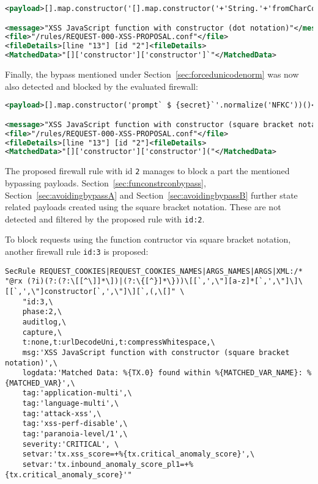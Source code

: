 \begin{lstlisting}[style=ruleStyle, language=XML, caption=fromCharCode() bypass blocked]
<payload>[].map.constructor('[].map.constructor('+'String.'+'fromCharCode(0x61,108,0x65,114,116,0x28,96,120,115,115,0x60,0x29)'+')();')();</payload>

<message>"XSS JavaScript function with constructor (dot notation)"</message>
<file>"/rules/REQUEST-000-XSS-PROPOSAL.conf"</file>
<fileDetails>[line "13"] [id "2"]<fileDetails>
<MatchedData>"[]['constructor']['constructor']`"</MatchedData>
\end{lstlisting}

Finally, the bypass mentioned under Section~\ref{sec:forcedunicodenorm} was now also detected and blocked by the evaluated firewall:

\begin{lstlisting}[style=ruleStyle, language=XML, caption=Forced Unicode Normalization bypass blocked]
<payload>[].map.constructor('prompt` $ {secret}`'.normalize('NFKC'))()</payload>

<message>"XSS JavaScript function with constructor (square bracket notation)"</message>
<file>"/rules/REQUEST-000-XSS-PROPOSAL.conf"</file>
<fileDetails>[line "13"] [id "2"]<fileDetails>
<MatchedData>"[]['constructor']['constructor']("</MatchedData>
\end{lstlisting}

The proposed firewall rule with id \verb|2| manages to block a part the mentioned bypassing payloads. Section~\ref{sec:funconstrconbypass}, Section~\ref{sec:avoidingbypassA} and Section~\ref{sec:avoidingbypassB} further state related payloads created using the square bracket notation. These are not detected and filtered by the proposed rule with \verb|id:2|.

To block requests using the function contructor via square bracket notation, another firewall rule \verb|id:3| is proposed:

\begin{lstlisting}[style=basicStyle, caption=Rule proposal to block usage of Function() constructor in square bracket notation, label={lst:constructorsruleproposalB}]
SecRule REQUEST_COOKIES|REQUEST_COOKIES_NAMES|ARGS_NAMES|ARGS|XML:/* "@rx (?i)(?:(?:\[[^\]]*\])|(?:\{[^}]*\}))\[[`,',\"][a-z]*[`,',\"]\]\[[`,',\"]constructor[`,',\"]\][`,(,\[]" \
    "id:3,\
    phase:2,\
    auditlog,\
    capture,\
    t:none,t:urlDecodeUni,t:compressWhitespace,\
    msg:'XSS JavaScript function with constructor (square bracket notation)',\
    logdata:'Matched Data: %{TX.0} found within %{MATCHED_VAR_NAME}: %{MATCHED_VAR}',\
    tag:'application-multi',\
    tag:'language-multi',\
    tag:'attack-xss',\
    tag:'xss-perf-disable',\
    tag:'paranoia-level/1',\
    severity:'CRITICAL', \
    setvar:'tx.xss_score=+%{tx.critical_anomaly_score}',\
    setvar:'tx.inbound_anomaly_score_pl1=+%{tx.critical_anomaly_score}'"
\end{lstlisting}

